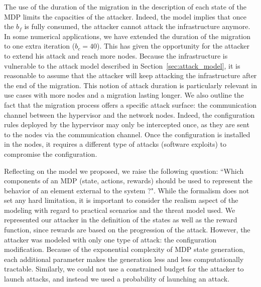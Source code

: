 The use of the duration of the migration in the description of each state of the MDP limits the capacities of the attacker. Indeed, the model implies that once the $b_f$ is fully consumed, the attacker cannot attack the infrastructure anymore. 
In some numerical applications, we have extended the duration of the migration to one extra iteration ($b_c = 40$). This has given the opportunity for the attacker to extend his attack and reach more nodes.
Because the infrastructure is vulnerable to the attack model described in Section~\ref{sec:attack_model}, it is reasonable to assume that the attacker will keep attacking the infrastructure after the end of the migration. This notion of attack duration is particularly relevant in use cases with more nodes and a migration lasting longer. 
We also outline the fact that the migration process offers a specific attack surface: the communication channel between the hypervisor and the network nodes. Indeed, the configuration rules deployed by the hypervisor may only be intercepted once, as they are sent to the nodes via the communication channel. Once the configuration is installed in the nodes, it requires a different type of attacks (\eg software exploits) to compromise the configuration.

Reflecting on the model we proposed, we raise the following question: ``Which components of an MDP (state, actions, rewards) should be used to represent the behavior of an element external to the system ?". While the formalism does not set any hard limitation, it is important to consider the realism aspect of the modeling with regard to practical scenarios and the threat model used. We represented our attacker in the definition of the states as well as the reward function, since rewards are based on the progression of the attack. 
However, the attacker was modeled with only one type of attack: the configuration modification. Because of the exponential complexity of MDP state generation, each additional parameter makes the generation less and less computationally tractable. Similarly, we could not use a constrained budget for the attacker to launch attacks, and instead we used a probability of launching an attack.

